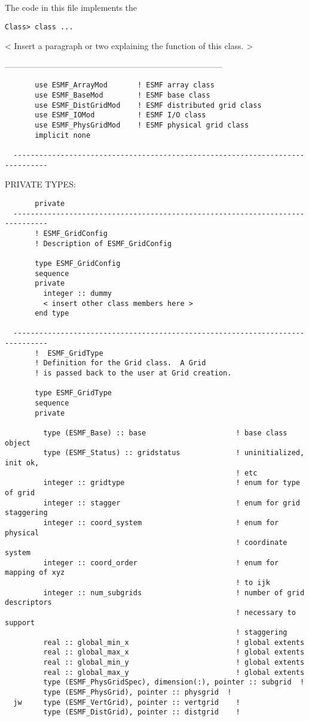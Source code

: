    The code in this file implements the {\tt Class> class ...
  
   < Insert a paragraph or two explaining the function of this class. >
  
  ------------------------------------------------------------------------------
\begin{verbatim}       use ESMF_ArrayMod       ! ESMF array class
       use ESMF_BaseMod        ! ESMF base class
       use ESMF_DistGridMod    ! ESMF distributed grid class
       use ESMF_IOMod          ! ESMF I/O class
       use ESMF_PhysGridMod    ! ESMF physical grid class
       implicit none
 
  ------------------------------------------------------------------------------\end{verbatim}{\sf PRIVATE TYPES:}
\begin{verbatim}       private
  ------------------------------------------------------------------------------
       ! ESMF_GridConfig
       ! Description of ESMF_GridConfig
 
       type ESMF_GridConfig
       sequence
       private
         integer :: dummy
         < insert other class members here >
       end type
 
  ------------------------------------------------------------------------------
       !  ESMF_GridType
       ! Definition for the Grid class.  A Grid
       ! is passed back to the user at Grid creation.
 
       type ESMF_GridType
       sequence
       private
 
         type (ESMF_Base) :: base                     ! base class object
         type (ESMF_Status) :: gridstatus             ! uninitialized, init ok,
                                                      ! etc
         integer :: gridtype                          ! enum for type of grid
         integer :: stagger                           ! enum for grid staggering
         integer :: coord_system                      ! enum for physical
                                                      ! coordinate system
         integer :: coord_order                       ! enum for mapping of xyz 
                                                      ! to ijk
         integer :: num_subgrids                      ! number of grid descriptors
                                                      ! necessary to support
                                                      ! staggering
         real :: global_min_x                         ! global extents
         real :: global_max_x                         ! global extents
         real :: global_min_y                         ! global extents
         real :: global_max_y                         ! global extents
         type (ESMF_PhysGridSpec), dimension(:), pointer :: subgrid  !
         type (ESMF_PhysGrid), pointer :: physgrid  !
  jw     type (ESMF_VertGrid), pointer :: vertgrid    !
         type (ESMF_DistGrid), pointer :: distgrid    !
 

\end{verbatim}}
